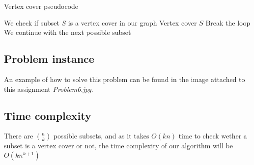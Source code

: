 \documentclass{article}
\begin{document}
\begin{algorithm}[H]
\caption{Vertex cover pseudocode}
\begin{algorithmic}[1]
 \State We check if subset $S$ is a vertex cover in our graph
  \State \Return Vertex cover $S$
  \State Break the loop
  \State We continue with the next possible subset
 \EndIf
\EndWhile
\end{algorithmic}
\end{algorithm}

\subsection*{Problem instance}

An example of how to solve this problem can be found in the image attached to this assignment \textit{Problem6.jpg}.

\subsection*{Time complexity}

There are $\binom{n}{k}$ possible subsets, and as it takes $O(kn)$ time to check wether a subset is a vertex cover or not, the time complexity of our algorithm will be $O(kn^{k+1})$
\end{document}
